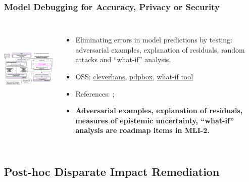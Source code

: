 \documentclass[11pt,
               aspectratio=169,
               hyperref={colorlinks}
               ]{beamer}
\begin{document}
			\begin{frame}
		
				\frametitle{Model Debugging for Accuracy, Privacy or Security}		
			
				\begin{columns}
	
					\centering
					\includegraphics[height=120pt]{img/md.png}
				
					\vspace{-5pt}
					\footnotesize{\begin{itemize}
						\item Eliminating errors in model predictions by testing: adversarial examples, explanation of residuals, random attacks and ``what-if'' analysis.
						\item OSS: \href{https://github.com/tensorflow/cleverhans}{cleverhans}, \href{https://github.com/SauceCat/PDPbox}{pdpbox}, \href{https://pair-code.github.io/what-if-tool/index.html}{what-if tool}
						\item References: ; 
						\item \textbf{Adversarial examples, explanation of residuals, measures of epistemic uncertainty, ``what-if'' analysis are roadmap items in MLI-2.}
					
					\end{itemize}}
				
				\end{columns}			
			
			\end{frame}
			
			
		\subsection{Post-hoc Disparate Impact Remediation}
		
\end{document}
